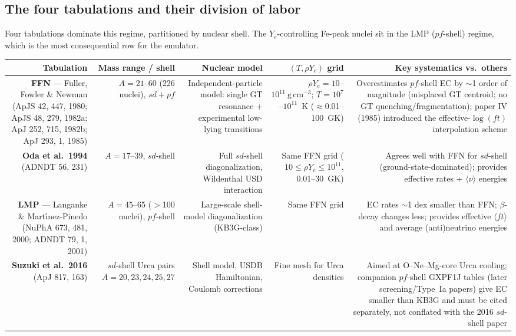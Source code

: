 \documentclass[11pt]{article}
\newcommand{\gcc}{\ensuremath{\mathrm{g\,cm^{-3}}}}
\begin{document}
\subsection{The four tabulations and their division of labor}

Four tabulations dominate this regime, partitioned by nuclear shell. The $Y_e$-controlling Fe-peak nuclei sit in the LMP ($pf$-shell) regime, which is the most consequential row for the emulator.

\begin{center}
\footnotesize
\setlength{\tabcolsep}{4pt}
\renewcommand{\arraystretch}{1.25}
\begin{tabularx}{\textwidth}{@{}R{0.95}R{0.85}R{1.0}R{0.9}R{1.3}@{}}
\toprule
\textbf{Tabulation} & \textbf{Mass range / shell} & \textbf{Nuclear model} & \textbf{$(T,\rho Y_e)$ grid} & \textbf{Key systematics vs.\ others} \\
\midrule
\textbf{FFN} --- Fuller, Fowler \& Newman (ApJS 42, 447, 1980; ApJS 48, 279, 1982a; ApJ 252, 715, 1982b; ApJ 293, 1, 1985) & $A = 21$--60 (226 nuclei), $sd{+}pf$ & Independent-particle model: single GT resonance + experimental low-lying transitions & $\rho Y_e = 10$--$10^{11}~\gcc$; $T = 10^7$--$10^{11}$~K ($\approx$0.01--100~GK) & Overestimates $pf$-shell EC by $\sim$1 order of magnitude (misplaced GT centroid; no GT quenching/fragmentation); paper IV (1985) introduced the effective-$\log(ft)$ interpolation scheme \\
\textbf{Oda et al.\ 1994} (ADNDT 56, 231) & $A = 17$--39, $sd$-shell & Full $sd$-shell diagonalization, Wildenthal USD interaction & Same FFN grid ($10 \le \rho Y_e \le 10^{11}$, 0.01--30~GK) & Agrees well with FFN for $sd$-shell (ground-state-dominated); provides effective rates + $\langle\nu\rangle$ energies \\
\textbf{LMP} --- Langanke \& Mart\'{\i}nez-Pinedo (NuPhA 673, 481, 2000; ADNDT 79, 1, 2001) & $A = 45$--65 ($>$100 nuclei), $pf$-shell & Large-scale shell-model diagonalization (KB3G-class) & Same FFN grid & EC rates $\sim$1 dex smaller than FFN; $\beta$-decay changes less; provides effective $\langle ft\rangle$ and average (anti)neutrino energies \\
\textbf{Suzuki et al.\ 2016} (ApJ 817, 163) & $sd$-shell Urca pairs $A = 20, 23, 24, 25, 27$ & Shell model, USDB Hamiltonian, Coulomb corrections & Fine mesh for Urca densities & Aimed at O--Ne--Mg-core Urca cooling; companion $pf$-shell GXPF1J tables (later screening/Type~Ia papers) give EC smaller than KB3G and must be cited separately, not conflated with the 2016 $sd$-shell paper \\
\bottomrule
\end{tabularx}
\end{center}
\end{document}
